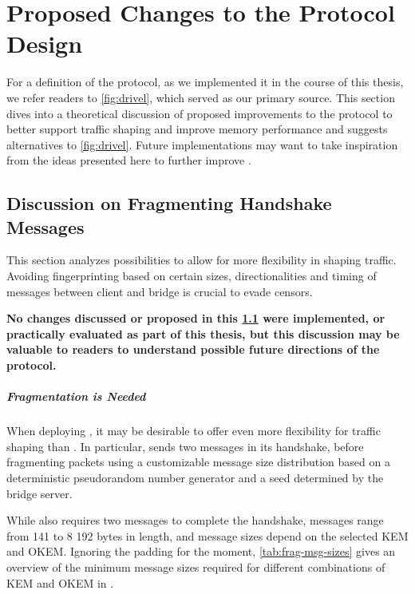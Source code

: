 \chapter{Proposed Changes to the Protocol Design}\label{ch:protocol-changes}

For a definition of the \drivel{} protocol, as we implemented it in the course of this thesis, we refer readers to \cref{fig:drivel}, which served as our primary source.
This section dives into a theoretical discussion of proposed improvements to the protocol to better support traffic shaping and improve memory performance and suggests alternatives to \cref{fig:drivel}.
Future implementations may want to take inspiration from the ideas presented here to further improve \drivel{}.

\section{Discussion on Fragmenting Handshake Messages} \label{ssec:fragmentation}

This section analyzes possibilities to allow for more flexibility in shaping \drivel{} traffic. Avoiding fingerprinting based on certain sizes, directionalities and timing of messages between client and bridge is crucial to evade censors.

\textbf{No changes discussed or proposed in this \cref{ssec:fragmentation} were implemented, or practically evaluated as part of this thesis, but this discussion may be valuable to readers to understand possible future directions of the protocol.}

\paragraph{Fragmentation is Needed}
When deploying \drivel{}, it may be desirable to offer even more flexibility for traffic shaping than \obfsfour{}. In particular, \obfsfour{} sends two messages in its handshake, before fragmenting packets using a customizable message size distribution based on a deterministic pseudorandom number generator and a seed determined by the bridge server.

While \drivel{} also requires two messages to complete the handshake, \obfsfour{} messages range from 141 to 8 192 bytes in length, and \drivel{} message sizes depend on the selected KEM and OKEM. Ignoring the padding for the moment, \cref{tab:frag-msg-sizes} gives an overview of the minimum message sizes required for different combinations of KEM and OKEM in \drivel{}.

